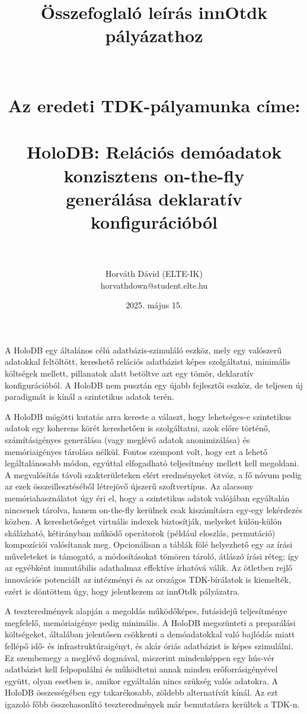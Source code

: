 \documentclass[12pt]{article}
\title{Összefoglaló leírás innOtdk pályázathoz \\ ~ \\ ~ \\ {\Large Az eredeti TDK-pályamunka címe: \\ ~ \\ HoloDB: Relációs demóadatok konzisztens on-the-fly \\ generálása deklaratív konfigurációból} \\ ~}
\author{Horváth Dávid (ELTE-IK) \\ horvathdown@student.elte.hu}
\date{2025. május 15.}
\begin{document}
\begin{titlepage}
\maketitle
\thispagestyle{empty}
\end{titlepage}

\cleardoublepage

A HoloDB egy általános célú adatbázis-szimuláló eszköz, mely egy valószerű adatokkal feltöltött, kereshető relációs adatbázist képes szolgáltatni,
minimális költségek mellett, pillanatok alatt betöltve azt egy tömör, deklaratív konfigurációból.
A HoloDB nem pusztán egy újabb fejlesztői eszköz, de teljesen új paradigmát is kínál a szintetikus adatok terén.

A HoloDB mögötti kutatás arra kereste a választ, hogy lehetséges-e szintetikus adatok egy koherens körét kereshetően is szolgáltatni, azok előre történő, számításigényes generálása (vagy meglévő adatok anonimizálása) és memóriaigényes tárolása nélkül.
Fontos szempont volt, hogy ezt a lehető legáltalánosabb módon, egyúttal elfogadható teljesítmény mellett kell megoldani.
A megvalósítás távoli szakterületeken elért eredményeket ötvöz, a fő nóvum pedig az ezek összeillesztéséből létrejövő újszerű szoftvertípus.
Az alacsony memóriahasználatot úgy éri el, hogy a szintetikus adatok valójában egyáltalán nincsenek tárolva, hanem on-the-fly kerülnek csak kiszámításra egy-egy lekérdezés közben.
A kereshetőséget virtuális indexek biztosítják, melyeket külön-külön skálázható, kétirányban működő operátorok (például eloszlás, permutáció) kompozíciói valósítanak meg.
Opcionálisan a táblák fölé helyezhető egy az írási műveleteket is támogató, a módosításokat tömören tároló, átlászó írási réteg;
így az egyébként immutábilis adathalmaz effektíve írhatóvá válik.
Az ötletben rejlő innovációs potenciált az intézményi és az országos TDK-bírálatok is kiemelték, ezért is döntöttem úgy, hogy jelentkezem az innOtdk pályázatra.

A teszteredmények alapján a megoldás működőképes, futásidejű teljesítménye megfelelő, memóriaigénye pedig minimális.
A HoloDB megszünteti a preparálási költségeket, általában jelentősen csökkenti a demóadatokkal való bajlódás miatt fellépő idő- és infrastruktúraigényt, és akár óriás adatbázist is képes szimulálni.
Ez szembemegy a meglévő dogmával, miszerint mindenképpen egy hús-vér adatbázist kell felpopulálni és működtetni annak minden erőforrásigényével együtt, olyan esetben is, amikor egyáltalán nincs szükség valós adatokra.
A HoloDB összességében egy takarékosabb, zöldebb alternatívát kínál.
Az ezt igazoló főbb összehasonlító teszteredmények már bemutatásra kerültek a TDK-n.
\end{document}
